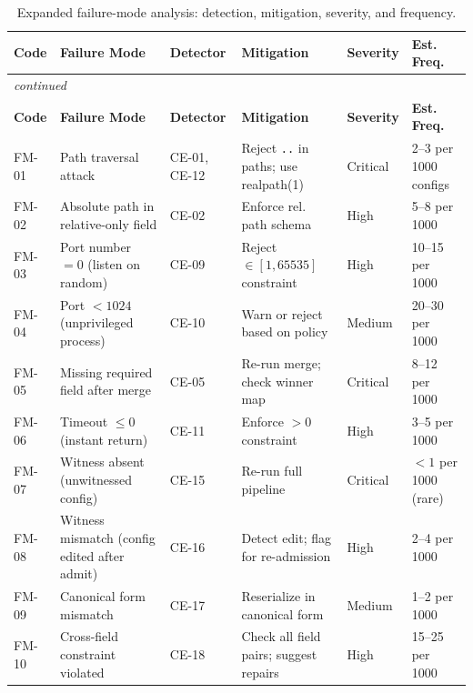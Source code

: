 \documentclass[12pt, letterpaper]{report}
\theoremstyle{plain}
\theoremstyle{definition}
\theoremstyle{remark}
\begin{document}
\begin{longtable}{@{}p{1.5cm}p{2.0cm}p{2.2cm}p{2.0cm}p{2.0cm}p{2.2cm}@{}}
\caption{Expanded failure-mode analysis: detection, mitigation, severity, and frequency.}
\label{tab:failure-modes} \\
\toprule
\textbf{Code} & \textbf{Failure Mode} & \textbf{Detector} & \textbf{Mitigation} & \textbf{Severity} & \textbf{Est. Freq.} \\
\midrule
\endfirsthead
\multicolumn{6}{l}{\small\textit{continued}} \\
\toprule
\textbf{Code} & \textbf{Failure Mode} & \textbf{Detector} & \textbf{Mitigation} & \textbf{Severity} & \textbf{Est. Freq.} \\
\midrule
\endhead

FM-01 & Path traversal attack & CE-01, CE-12 & Reject \texttt{..} in paths; use realpath(1) & Critical & 2--3 per 1000 configs \\

FM-02 & Absolute path in relative-only field & CE-02 & Enforce rel. path schema & High & 5--8 per 1000 \\

FM-03 & Port number $= 0$ (listen on random) & CE-09 & Reject $\in [1,65535]$ constraint & High & 10--15 per 1000 \\

FM-04 & Port $< 1024$ (unprivileged process) & CE-10 & Warn or reject based on policy & Medium & 20--30 per 1000 \\

FM-05 & Missing required field after merge & CE-05 & Re-run merge; check winner map & Critical & 8--12 per 1000 \\

FM-06 & Timeout $\leq 0$ (instant return) & CE-11 & Enforce $> 0$ constraint & High & 3--5 per 1000 \\

FM-07 & Witness absent (unwitnessed config) & CE-15 & Re-run full pipeline & Critical & $< 1$ per 1000 (rare) \\

FM-08 & Witness mismatch (config edited after admit) & CE-16 & Detect edit; flag for re-admission & High & 2--4 per 1000 \\

FM-09 & Canonical form mismatch & CE-17 & Reserialize in canonical form & Medium & 1--2 per 1000 \\

FM-10 & Cross-field constraint violated & CE-18 & Check all field pairs; suggest repairs & High & 15--25 per 1000 \\


\end{longtable}
\end{document}
